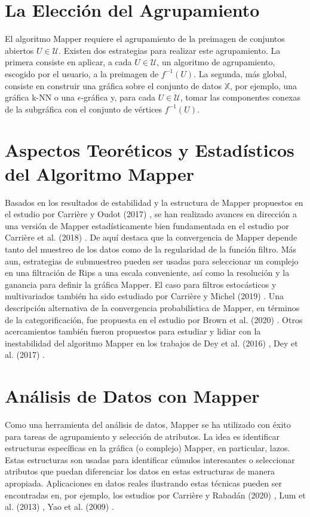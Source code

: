 \section*{La Elecci\'on del Agrupamiento}

El algoritmo Mapper requiere el agrupamiento de la preimagen de conjuntos abiertos $U\in\mathcal{U}$.
Existen dos estrategias para realizar este agrupamiento. La primera consiste en aplicar, a cada
$U\in\mathcal{U}$, un algoritmo de agrupamiento, escogido por el usuario, a la preimagen de
$f^{-1}\left(U\right)$. La segunda, m\'as global, consiste en construir una gr\'afica sobre el
conjunto de datos $\mathbb{X}$, por ejemplo, una gr\'afica k-NN o una $\epsilon$-gr\'afica y, para cada
$U\in\mathcal{U}$, tomar las componentes conexas de la subgr\'afica con el conjunto de v\'ertices
$f^{-1}\left(U\right)$.

\section*{Aspectos Teor\'eticos y Estad\'isticos del Algoritmo Mapper}

Basados en los resultados de estabilidad y la estructura de Mapper propuestos en el estudio por
Carri\`ere y Oudot (2017) \cite{Carriere2017}, se han realizado avances en direcci\'on a
una versi\'on de Mapper estad\'isticamente bien fundamentada en el estudio por Carri\`ere et al. (2018)
\cite{Carriere2018}. De aqu\'i destaca que la convergencia de Mapper depende tanto del muestreo de los
datos como de la regularidad de la funci\'on filtro. M\'as aun, estrategias de submuestreo pueden ser
usadas para seleccionar un complejo en una filtraci\'on de Rips a una escala conveniente, as\'i como la
resoluci\'on y la ganancia para definir la gr\'afica Mapper. El caso para filtros estoc\'asticos y
multivariados tambi\'en ha sido estudiado por Carri\`ere y Michel (2019) \cite{Carriere2019}.
Una descripci\'on alternativa de la convergencia probabil\'istica de Mapper, en t\'erminos de la
categorificaci\'on, fue propuesta en el estudio por Brown et al. (2020) \cite{Brown2020}. Otros
acercamientos tambi\'en fueron propuestos para estudiar y lidiar con la inestabilidad del algoritmo
Mapper en los trabajos de Dey et al. (2016) \cite{Dey2016}, Dey et al. (2017) \cite{Dey2017}.

\section*{An\'alisis de Datos con Mapper}

Como una herramienta del an\'alisis de datos, Mapper se ha utilizado con \'exito para tareas de
agrupamiento y selecci\'on de atributos. La idea es identificar estructuras
espec\'ificas en la gr\'afica (o complejo) Mapper, en particular, lazos.
Estas estructuras son usadas para identificar
c\'umulos interesantes o seleccionar atributos que puedan diferenciar los datos en estas estructuras de
manera apropiada. Aplicaciones en datos reales ilustrando estas t\'ecnicas pueden ser encontradas en,
por ejemplo, los estudios por Carri\`ere y Rabad\'an (2020) \cite{Carriere2020}, Lum et al. (2013)
\cite{Lum2013}, Yao et al. (2009) \cite{Yao2009}.